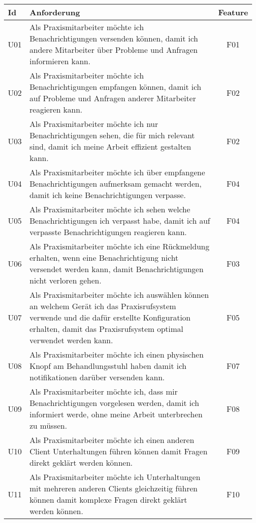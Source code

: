 \begin{table}[h]
    \centering
    \begin{tabular}{|l|p{13cm}|c|}
        \hline
        \textbf{Id} & \textbf{Anforderung}                                                                                                                                                                                         & \textbf{Feature} \\
        \hline
        U01         & Als Praxismitarbeiter möchte ich Benachrichtigungen versenden können, damit ich andere Mitarbeiter über Probleme und Anfragen informieren kann. & F01 \\
        \hline
        U02         & Als Praxismitarbeiter möchte ich Benachrichtigungen empfangen können, damit ich auf Probleme und Anfragen anderer Mitarbeiter reagieren kann. & F02 \\
        \hline
        U03         & Als Praxismitarbeiter möchte ich nur Benachrichtigungen sehen, die für mich relevant sind, damit ich meine Arbeit effizient gestalten kann. & F02 \\
        \hline
        U04         & Als Praxismitarbeiter möchte ich über empfangene Benachrichtigungen aufmerksam gemacht werden, damit ich keine Benachrichtigungen verpasse. & F04 \\
        \hline
        U05         & Als Praxismitarbeiter möchte ich sehen welche Benachrichtigungen ich verpasst habe, damit ich auf verpasste Benachrichtigungen reagieren kann. & F04 \\
        \hline
        U06         & Als Praxismitarbeiter möchte ich eine Rückmeldung erhalten, wenn eine Benachrichtigung nicht versendet werden kann, damit Benachrichtigungen nicht verloren gehen. & F03 \\
        \hline
        U07         & Als Praxismitarbeiter möchte ich auswählen können an welchem Gerät ich das Praxisrufsystem verwende und die dafür erstellte Konfiguration erhalten, damit das Praxisrufsystem optimal verwendet werden kann. & F05 \\
        \hline
        U08          & Als Praxismitarbeiter möchte ich einen physischen Knopf am Behandlungsstuhl haben damit ich notifikationen darüber versenden kann. & F07 \\
        \hline
        U09          & Als Praxismitarbeiter möchte ich, dass mir Benachrichtigungen vorgelesen werden, damit ich informiert werde, ohne meine Arbeit unterbrechen zu müssen. & F08 \\
        \hline
        U10         & Als Praxismitarbeiter möchte ich einen anderen Client Unterhaltungen führen können damit Fragen direkt geklärt werden können. & F09 \\
        \hline
        U11         & Als Praxismitarbeiter möchte ich Unterhaltungen mit mehreren anderen Clients gleichzeitig führen können damit komplexe Fragen direkt geklärt werden können. & F10 \\
        \hline
    \end{tabular}\label{tab:userstories1}
\end{table}

